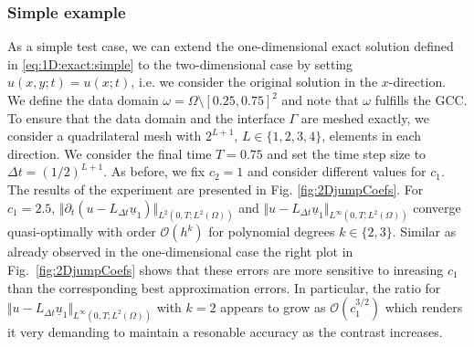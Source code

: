 \documentclass[sn-mathphys-num]{sn-jnl}
\numberwithin{equation}{section}
\newcommand{\ul}{\underline{u}}
\newcommand{\dt}{\partial_t}
\begin{document}
\subsubsection{Simple example} 
As a simple test case, we can extend the one-dimensional exact solution defined in \eqref{eq:1D:exact:simple} to the two-dimensional case by setting $u(x,y;t) = u(x;t)$, i.e. we consider the original solution in the $x$-direction. We define the data domain $\omega = \Omega \setminus [0.25,0.75]^2$ and note that $\omega$ fulfills the GCC. To ensure that the data domain and the interface $\Gamma$ are meshed exactly, we consider a quadrilateral mesh with $2^{L+1}$, $L \in \{1,2,3,4\}$, elements in each direction. We consider the final time $T = 0.75$  and set the time step size to $\Delta t = (1/2)^{L+1}$. As before, we fix $c_2 = 1$ and consider different values for $c_1$. The results of the experiment are presented in Fig. \ref{fig:2DjumpCoefs}. 
For $c_1 = 2.5$, $\Vert \dt(u-L_{\Delta t} \ul_1) \Vert_{L^2(0,T;L^2(\Omega))}$ and $\Vert u-L_{\Delta t} \ul_1 \Vert_{L^\infty(0,T;L^2(\Omega))}$ converge quasi-optimally with order $\mathcal{O}(h^k)$ for polynomial degrees $k \in \{2,3\}$. Similar as already observed in the one-dimensional case the right plot in Fig.~\ref{fig:2DjumpCoefs} shows that these errors are more sensitive to inreasing $c_1$ than the corresponding best approximation errors. 
In particular, the ratio for $\Vert u-L_{\Delta t} \ul_1 \Vert_{L^\infty(0,T;L^2(\Omega))}$ with $k=2$ appears to grow as $\mathcal{O}(c_1^{3/2})$ which renders it very demanding to maintain a resonable accuracy as the contrast increases. 
\end{document}
